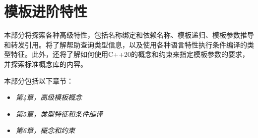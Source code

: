 \part{模板进阶特性}
本部分将探索各种高级特性，包括名称绑定和依赖名称、模板递归、模板参数推导和转发引用。将了解帮助查询类型信息，以及使用各种语言特性执行条件编译的类型特征。此外，还将了解如何使用C++20的概念和约束来指定模板参数的要求，并探索标准概念库的内容。

本部分包括以下章节：

\begin{itemize}
  \item \textit{第4章，高级模板概念}
  \item \textit{第5章，类型特征和条件编译}
  \item \textit{第6章，概念和约束}
\end{itemize}



